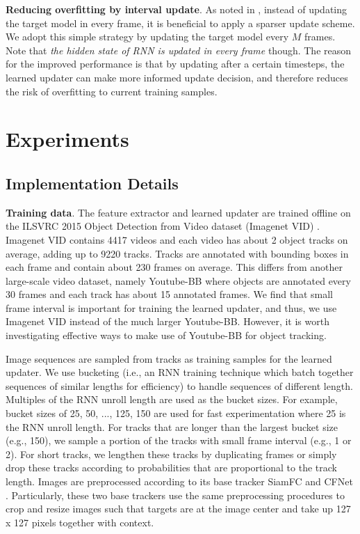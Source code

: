 \documentclass[journal]{IEEEtran}
\begin{document}
\textbf{Reducing overfitting by interval update}. As noted in \cite{Danelljan2016ECOEC}, instead of updating the target model in every frame, it is beneficial to apply a sparser update scheme. We adopt this simple strategy by updating the target model every $M$ frames. Note that \emph{the hidden state of RNN is updated in every frame} though. The reason for the improved performance is that by updating after a certain timesteps, the learned updater can make more informed update decision, and therefore reduces the risk of overfitting to current training samples.

\section{Experiments}\label{sec:experiments}
\subsection{Implementation Details}
\textbf{Training data}. The feature extractor and learned updater are trained offline on the ILSVRC 2015 Object Detection from Video dataset (Imagenet VID) \cite{russakovsky2015imagenet}. Imagenet VID contains 4417 videos and each video has about 2 object tracks on average, adding up to 9220 tracks. Tracks are annotated with bounding boxes in each frame and contain about 230 frames on average. This differs from another large-scale video dataset, namely Youtube-BB \cite{real2017youtube} where objects are annotated every 30 frames and each track has about 15 annotated frames. We find that small frame interval is important for training the learned updater, and thus, we use Imagenet VID instead of the much larger Youtube-BB. However, it is worth investigating effective ways to make use of Youtube-BB for object tracking. 

Image sequences are sampled from tracks as training samples for the learned updater. We use bucketing \cite{khomenko2016accelerating} (i.e., an RNN training technique which batch together sequences of similar lengths for efficiency) to handle sequences of different length. Multiples of the RNN unroll length are used as the bucket sizes. For example, bucket sizes of 25, 50, ..., 125, 150 are used for fast experimentation where 25 is the RNN unroll length. For tracks that are longer than the largest bucket size (e.g., 150), we sample a portion of the tracks with small frame interval (e.g., 1 or 2). For short tracks, we lengthen these tracks by duplicating frames or simply drop these tracks according to probabilities that are proportional to the track length. Images are preprocessed according to its base tracker SiamFC \cite{bertinetto2016fully} and CFNet \cite{valmadre2017end}. Particularly, these two base trackers use the same preprocessing procedures to crop and resize images such that targets are at the image center and take up 127 x 127 pixels together with context.
\end{document}
